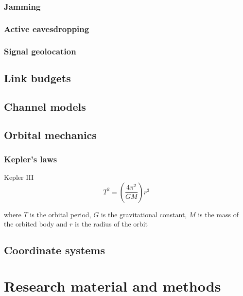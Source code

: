 \documentclass[english, 12pt, a4paper, elec, utf8, a-1b, online]{aaltothesis}
\begin{document}
\subsubsection{Jamming}

\subsubsection{Active eavesdropping}

\subsubsection{Signal geolocation}

\subsection{Link budgets}
\subsection{Channel models}

\subsection{Orbital mechanics}
\subsubsection{Kepler's laws}

Kepler III
\begin{equation} \label{eq-kepler-3}
  T^2 = (\frac{4\pi^2}{GM})r^3
\end{equation}

where $T$ is the orbital period, $G$ is the gravitational constant, $M$ is the mass of the orbited body and $r$ is the radius of the orbit %
\subsection{Coordinate systems}

\clearpage

\section{Research material and methods}

\end{document}
